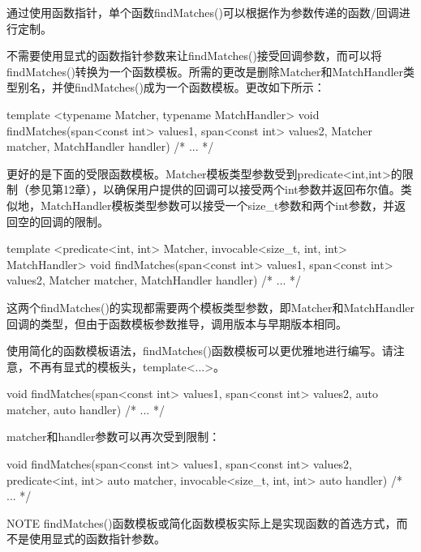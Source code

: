通过使用函数指针，单个函数findMatches()可以根据作为参数传递的函数/回调进行定制。


不需要使用显式的函数指针参数来让findMatches()接受回调参数，而可以将findMatches()转换为一个函数模板。所需的更改是删除Matcher和MatchHandler类型别名，并使findMatches()成为一个函数模板。更改如下所示：

\begin{cpp}
template <typename Matcher, typename MatchHandler>
void findMatches(span<const int> values1, span<const int> values2,
    Matcher matcher, MatchHandler handler)
{ /* ... */ }
\end{cpp}

更好的是下面的受限函数模板。Matcher模板类型参数受到predicate<int,int>的限制（参见第12章），以确保用户提供的回调可以接受两个int参数并返回布尔值。类似地，MatchHandler模板类型参数可以接受一个size\_t参数和两个int参数，并返回空的回调的限制。

\begin{cpp}
template <predicate<int, int> Matcher, invocable<size_t, int, int> MatchHandler>
void findMatches(span<const int> values1, span<const int> values2,
    Matcher matcher, MatchHandler handler)
{ /* ... */ }
\end{cpp}

这两个findMatches()的实现都需要两个模板类型参数，即Matcher和MatchHandler回调的类型，但由于函数模板参数推导，调用版本与早期版本相同。

使用简化的函数模板语法，findMatches()函数模板可以更优雅地进行编写。请注意，不再有显式的模板头，template<...>。

\begin{cpp}
void findMatches(span<const int> values1, span<const int> values2,
    auto matcher, auto handler)
{ /* ... */ }
\end{cpp}

matcher和handler参数可以再次受到限制：

\begin{cpp}
void findMatches(span<const int> values1, span<const int> values2,
    predicate<int, int> auto matcher, invocable<size_t, int, int> auto handler)
{ /* ... */ }
\end{cpp}

\begin{myNotic}{NOTE}
findMatches()函数模板或简化函数模板实际上是实现函数的首选方式，而不是使用显式的函数指针参数。
\end{myNotic}

